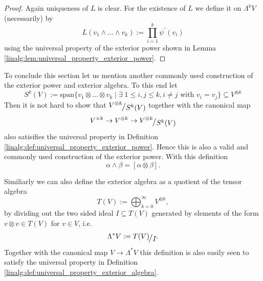 \begin{proof}
    Again uniqueness of $L$ is clear. For the existence of $L$ we define it on $\Lambda^k V$ (necessarily) by 
    \[
    L(v_1 \wedge \ldots \wedge v_k) := \prod_{i=1}^k \psi^\prime(v_i)
    \]
    using the universal property of the exterior power shown in Lemma \ref{linalg:lem:universal_property_exterior_power}.
\end{proof}


To conclude this section let us mention another commonly used construction of the exterior power and exterior algebra. To this end let 
\[
S^k(V) := \mathrm{span}\{v_1\otimes\ldots\otimes v_k \mid \exists \; 1 \leq i,j \leq k, i \neq j \text{ with } v_i = v_j\} \subseteq V^{\otimes k}
\]
Then it is not hard to show that $\modulo{V^{\otimes k}}{S^k(V)}$ together with the canonical map 
\[
V^{\times k} \to V^{\otimes k} \to \modulo{V^{\otimes k}}{S^k(V)}
\]
also satisifies the universal property in Definition \ref{linalg:def:universal_property_exterior_power}. Hence this is also a valid and commonly used construction of the exterior power. With this definition 
\[
\alpha \wedge \beta = [\alpha \otimes \beta].
\]




\noindent Similiarly we can also define the exterior algebra as a quotient of the tensor algebra
\[
T(V) := \bigoplus_{k=0}^\infty V^{\otimes k},
\]
by dividing out the two sided ideal $I \subseteq T(V)$ generated by elements of the form $v \otimes v \in T(V)$ for $v \in V$, i.e. 
\[
\Lambda^\ast V := \modulo{T(V)}{I}.
\]
Together with the canonical map $V \to \Lambda^\ast V$ this definition is also easily seen to satisfy the universal property in Definition \ref{linalg:def:universal_property_exterior_algebra}.
